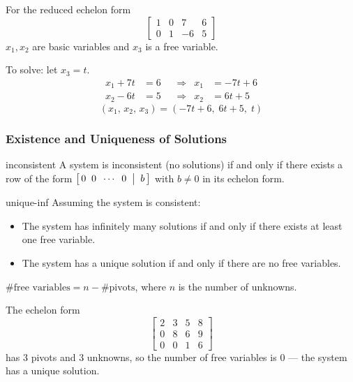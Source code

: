 \begin{example}
  For the reduced echelon form
  \[
    \left[
      \begin{array}{ccc|c}
        \boxed{1} & 0         & 7  & 6 \\
        0         & \boxed{1} & -6 & 5
      \end{array}
      \right]
  \]
  $x_1, x_2$ are basic variables and $x_3$ is a free variable.

  To solve: let $x_3 = t$.
  \begin{align*}
    x_1 + 7t & = 6 &  & \Longrightarrow & x_1 & = -7t + 6 \\
    x_2 - 6t & = 5 &  & \Longrightarrow & x_2 & = 6t + 5
  \end{align*}
  \[
    (x_1,\, x_2,\, x_3) = (-7t + 6,\; 6t + 5,\; t)
  \]
\end{example}

\subsubsection{Existence and Uniqueness of Solutions}

\begin{theorem}{}{inconsistent}
  A system is inconsistent (no solutions) if and only if there exists a row of the form
  $\bigl[\,0 \;\; 0 \;\; \cdots \;\; 0 \;\bigm|\; b\,\bigr]$ with $b \neq 0$ in its echelon form.
\end{theorem}

\begin{theorem}{}{unique-inf}
  Assuming the system is consistent:
  \begin{itemize}
    \item The system has infinitely many solutions if and only if there exists at least one free variable.
    \item The system has a unique solution if and only if there are no free variables.
  \end{itemize}
\end{theorem}

\begin{remark}
  $\text{\# free variables} = n - \text{\# pivots}$, where $n$ is the number of unknowns.
\end{remark}

\begin{example}
  The echelon form
  \[
    \left[
      \begin{array}{ccc|c}
        \boxed{2} & 3         & 5         & 8 \\
        0         & \boxed{8} & 6         & 9 \\
        0         & 0         & \boxed{1} & 6
      \end{array}
      \right]
  \]
  has $3$ pivots and $3$ unknowns, so the number of free variables is $0$ --- the system has a unique solution.
\end{example}

